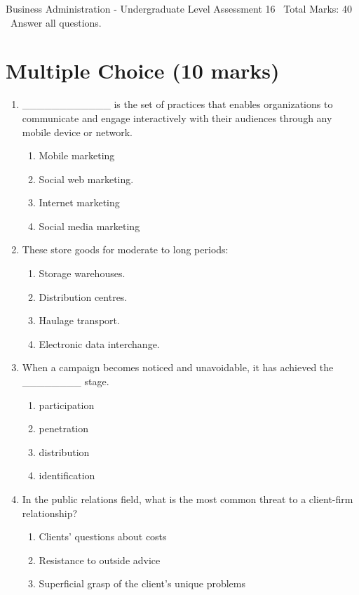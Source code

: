 \documentclass[12pt]{article}
\begin{document}
\begin{center}
Business Administration - Undergraduate Level Assessment 16 \
Total Marks: 40 \
Answer all questions.
\end{center}

\section*{Multiple Choice (10 marks)}
\begin{enumerate}[label=\arabic*.]
\item \_\_\_\_\_\_\_\_\_\_\_\_ is the set of practices that enables organizations to communicate and engage interactively with their audiences through any mobile device or network.
\begin{enumerate}[label=(\alph*)]
    \item Mobile marketing
    \item Social web marketing.
    \item Internet marketing
    \item Social media marketing
\end{enumerate}
\item These store goods for moderate to long periods:
\begin{enumerate}[label=(\alph*)]
    \item Storage warehouses.
    \item Distribution centres.
    \item Haulage transport.
    \item Electronic data interchange.
\end{enumerate}
\item When a campaign becomes noticed and unavoidable, it has achieved the \_\_\_\_\_\_\_\_ stage.
\begin{enumerate}[label=(\alph*)]
    \item participation
    \item penetration
    \item distribution
    \item identification
\end{enumerate}
\item In the public relations field, what is the most common threat to a client-firm relationship?
\begin{enumerate}[label=(\alph*)]
    \item Clients' questions about costs
    \item Resistance to outside advice
    \item Superficial grasp of the client's unique problems

\end{enumerate}
\end{enumerate}
\end{document}
